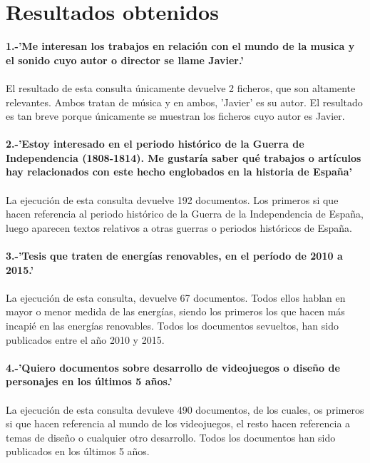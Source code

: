 \documentclass[a4paper]{article}
\begin{document}
\section{Resultados obtenidos}
\textbf{1.-'Me interesan los trabajos en relación con el mundo de la musica y el sonido cuyo autor o director se llame Javier.'}
\paragraph{}El resultado de esta consulta únicamente devuelve 2 ficheros, que son altamente relevantes. Ambos tratan de música y en ambos, 'Javier' es su autor. El resultado es tan breve porque únicamente se muestran los ficheros cuyo autor es Javier.
\paragraph{} \textbf{2.-'Estoy interesado en el periodo histórico de la Guerra de Independencia (1808-1814). Me gustaría saber qué trabajos o artículos hay relacionados con este hecho englobados en la historia de España'}
\paragraph{}La ejecución de esta consulta devuelve 192 documentos. Los primeros si que hacen referencia al periodo histórico de la Guerra de la Independencia de España, luego aparecen textos relativos a otras guerras o periodos históricos de España.

\paragraph{}\textbf{3.-'Tesis que traten de energías renovables, en el período de 2010 a 2015.'}
\paragraph{}La ejecución de esta consulta, devuelve 67 documentos. Todos ellos hablan en mayor o menor medida de las energías, siendo los primeros los que hacen más incapié en las energías renovables. Todos los documentos sevueltos, han sido publicados entre el año 2010 y 2015.

\paragraph{}\textbf{4.-'Quiero documentos sobre desarrollo de videojuegos o diseño de personajes en los últimos 5 años.'}
\paragraph{}La ejecución de esta consulta devuleve 490 documentos, de los cuales, os primeros si que hacen referencia al mundo de los videojuegos, el resto hacen referencia a temas de diseño o cualquier otro desarrollo. Todos los documentos han sido publicados en los últimos 5 años.
\end{document}
